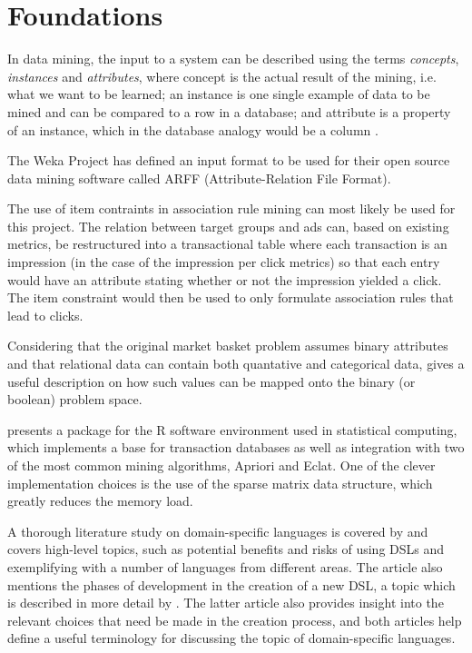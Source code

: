 \documentclass[a4paper]{article}
\begin{document}
\section{Foundations}

In data mining, the input to a system can be described using the terms \emph{concepts}, \emph{instances} and \emph{attributes},
where concept is the actual result of the mining, i.e. what we want to be learned; an instance is one single example of data to be
mined and can be compared to a row in a database; and attribute is a property of an instance, which in the database analogy would
be a column \citep{Witten2011}.

The Weka Project has defined an input format to be used for their open source data mining software called ARFF (Attribute-Relation
File Format).

The use of item contraints in association rule mining \citep{Srikant1997} can most likely be used for this project. The
relation between target groups and ads can, based on existing metrics, be restructured into a transactional table where each
transaction is an impression (in the case of the impression per click metrics) so that each entry would have an attribute
stating whether or not the impression yielded a click. The item constraint would then be used to only formulate association
rules that lead to clicks.

Considering that the original market basket problem assumes binary attributes and that relational data can contain both
quantative and categorical data, \citep{Srikant1996} gives a useful description on how such values can be mapped onto the
binary (or boolean) problem space.

\citet{Hahsler2007} presents a package for the R software environment used in statistical computing, which implements a base
for transaction databases as well as integration with two of the most common mining algorithms, Apriori and Eclat. One of the
clever implementation choices is the use of the sparse matrix data structure, which greatly reduces the memory load.

A thorough literature study on domain-specific languages is covered by \citet{Deursen2000} and covers high-level topics, such as
potential benefits and risks of using DSLs and exemplifying with a number of languages from different areas. The article also
mentions the phases of development in the creation of a new DSL, a topic which is described in more detail by \citet{Mernik2005}.
The latter article also provides insight into the relevant choices that need be made in the creation process, and both articles
help define a useful terminology for discussing the topic of domain-specific languages.
\end{document}
